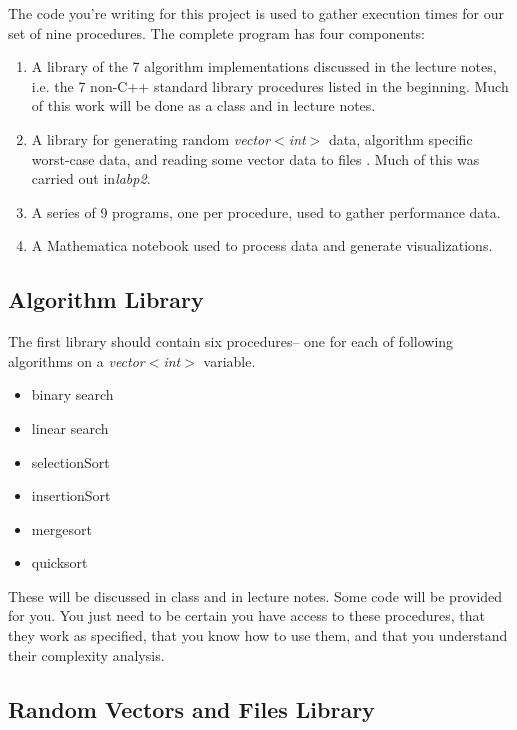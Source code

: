 \documentclass[]{tufte-handout}
\begin{document}
The code you're writing for this project is used to gather execution times for our set of nine procedures. The complete program has four components:
\begin{enumerate}
\item A library of the 7 algorithm implementations discussed in the lecture notes, i.e. the 7 non-C++ standard library procedures listed in the beginning. Much of this work will be done as a class and in lecture notes. 
\item A library for generating random \textit{vector$<$int$>$} data, algorithm specific worst-case data, and reading some vector data to files .  Much of this was carried out in\textit{labp2}.
\item A series of 9 programs, one per procedure, used to gather performance data.
\item A Mathematica notebook used to process data and generate visualizations.
\end{enumerate}


\subsection{Algorithm Library}
The first library should contain six procedures-- one for each of following algorithms on a \textit{vector$<$int$>$} variable.
\begin{itemize}
\item binary search 
\item linear search
\item selectionSort
\item insertionSort
\item mergesort
\item quicksort
\end{itemize}
These will be discussed in class and in lecture notes. Some code will be provided for you. You just need to be certain you have access to these procedures, that they work as specified, that you know how to use them, and that you understand their complexity analysis.

\subsection{Random Vectors and Files Library}
\end{document}
